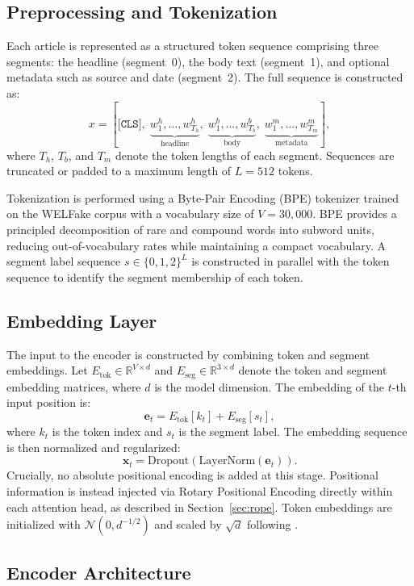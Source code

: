\documentclass[conference]{IEEEtran}
\begin{document}
\subsection{Preprocessing and Tokenization}

Each article is represented as a structured token sequence comprising three segments: the headline (segment~0), the body text (segment~1), and optional metadata such as source and date (segment~2). The full sequence is constructed as:
\[
x = [\texttt{[CLS]},\; \underbrace{w_1^h, \dots, w_{T_h}^h}_{\text{headline}},\; \underbrace{w_1^b, \dots, w_{T_b}^b}_{\text{body}},\; \underbrace{w_1^m, \dots, w_{T_m}^m}_{\text{metadata}}],
\]
where $T_h$, $T_b$, and $T_m$ denote the token lengths of each segment. Sequences are truncated or padded to a maximum length of $L = 512$ tokens.

Tokenization is performed using a Byte-Pair Encoding (BPE) tokenizer trained on the WELFake corpus with a vocabulary size of $V = 30{,}000$. BPE provides a principled decomposition of rare and compound words into subword units, reducing out-of-vocabulary rates while maintaining a compact vocabulary. A segment label sequence $s \in \{0, 1, 2\}^L$ is constructed in parallel with the token sequence to identify the segment membership of each token.

\subsection{Embedding Layer}

The input to the encoder is constructed by combining token and segment embeddings. Let $E_{\text{tok}} \in \mathbb{R}^{V \times d}$ and $E_{\text{seg}} \in \mathbb{R}^{3 \times d}$ denote the token and segment embedding matrices, where $d$ is the model dimension. The embedding of the $t$-th input position is:
\[
\mathbf{e}_t = E_{\text{tok}}[k_t] + E_{\text{seg}}[s_t],
\]
where $k_t$ is the token index and $s_t$ is the segment label. The embedding sequence is then normalized and regularized:
\[
\mathbf{x}_t = \text{Dropout}(\text{LayerNorm}(\mathbf{e}_t)).
\]
Crucially, no absolute positional encoding is added at this stage. Positional information is instead injected via Rotary Positional Encoding directly within each attention head, as described in Section~\ref{sec:rope}. Token embeddings are initialized with $\mathcal{N}(0, d^{-1/2})$ and scaled by $\sqrt{d}$ following \cite{vaswani2017attention}.

\subsection{Encoder Architecture}
\end{document}
